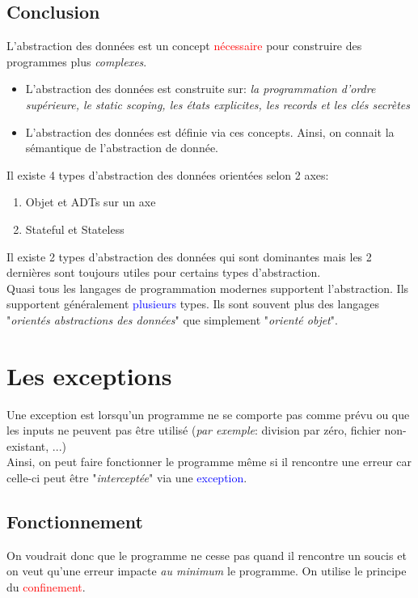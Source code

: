 \documentclass{report}
\begin{document}
\section{Conclusion}
\noindent
L'abstraction des données est un concept \textcolor{red}{nécessaire} pour construire des programmes plus \textit{complexes}.
\begin{itemize}
\item L'abstraction des données est construite sur: \textit{la programmation d'ordre supérieure, le static scoping, les états explicites, les records et les clés secrètes}
\item L'abstraction des données est définie via ces concepts. Ainsi, on connait la sémantique de l'abstraction de donnée.
\end{itemize} 
Il existe 4 types d'abstraction des données orientées selon 2 axes: 
\begin{enumerate}
\item Objet et ADTs sur un axe
\item Stateful et Stateless
\end{enumerate} 
Il existe 2 types d'abstraction des données qui sont dominantes mais les 2 dernières sont toujours utiles pour certains types d'abstraction.\\
Quasi tous les langages de programmation modernes supportent l'abstraction. Ils supportent généralement \textcolor{blue}{plusieurs} types. Ils sont souvent plus des langages "\textit{orientés abstractions des données}" que simplement "\textit{orienté objet}".


\chapter{Les exceptions}
Une exception est lorsqu'un programme ne se comporte pas comme prévu ou que les inputs ne peuvent pas être utilisé (\textit{par exemple}: division par zéro, fichier non-existant, ...)\\
Ainsi, on peut faire fonctionner le programme même si il rencontre une erreur car celle-ci peut être "\textit{interceptée}" via une \textcolor{blue}{exception}.

\section{Fonctionnement}
On voudrait donc que le programme ne cesse pas quand il rencontre un soucis et on veut qu'une erreur impacte \textit{au minimum} le programme. On utilise le principe du \textcolor{red}{confinement}.
\end{document}
